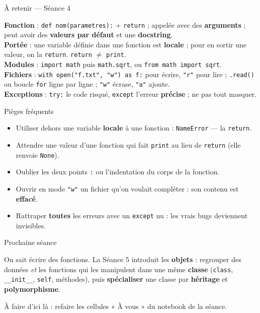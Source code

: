 \documentclass[aspectratio=169,11pt]{beamer}
\begin{document}
\begin{frame}{À retenir — Séance 4}
\begin{ucadret}[L'essentiel]
{\small
\textbf{Fonction} : \texttt{def nom(parametres):} + \texttt{return} ; appelée avec des \textbf{arguments} ; peut avoir des \textbf{valeurs par défaut} et une \textbf{docstring}.\\[2pt]
\textbf{Portée} : une variable définie dans une fonction est \textbf{locale} ; pour en sortir une valeur, on la \texttt{return}. \texttt{return} $\neq$ \texttt{print}.\\[2pt]
\textbf{Modules} : \texttt{import math} puis \texttt{math.sqrt}, ou \texttt{from math import sqrt}.\\[2pt]
\textbf{Fichiers} : \texttt{with open("f.txt", "w") as f:} pour écrire, \texttt{"r"} pour lire ; \texttt{.read()} ou boucle \texttt{for} ligne par ligne ; \texttt{"w"} écrase, \texttt{"a"} ajoute.\\[2pt]
\textbf{Exceptions} : \texttt{try:} le code risqué, \texttt{except} l'erreur \textbf{précise} ; ne pas tout masquer.}
\end{ucadret}
\end{frame}

\begin{frame}{Pièges fréquents}
\begin{itemize}\small
  \item Utiliser dehors une variable \textbf{locale} à une fonction : \texttt{NameError} — la \texttt{return}.
  \item Attendre une valeur d'une fonction qui fait \texttt{print} au lieu de \texttt{return} (elle renvoie \texttt{None}).
  \item Oublier les deux points \texttt{:} ou l'indentation du corps de la fonction.
  \item Ouvrir en mode \texttt{"w"} un fichier qu'on voulait compléter : son contenu est \textbf{effacé}.
  \item Rattraper \textbf{toutes} les erreurs avec un \texttt{except} nu : les vrais bugs deviennent invisibles.
\end{itemize}
\end{frame}

\begin{frame}{Prochaine séance}
\begin{ucaddef}
{\small On sait écrire des fonctions. La Séance 5 introduit les \textbf{objets} : regrouper des données \emph{et} les fonctions qui les manipulent dans une même \textbf{classe} (\texttt{class}, \texttt{\_\_init\_\_}, \texttt{self}, méthodes), puis \textbf{spécialiser} une classe par \textbf{héritage} et \textbf{polymorphisme}.}
\end{ucaddef}
{\small À faire d'ici là : refaire les cellules « À vous » du notebook de la séance.}
\end{frame}
\end{document}
